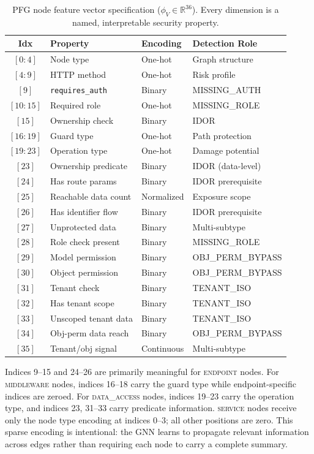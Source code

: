 \begin{table}[htbp]
\centering
\caption{PFG node feature vector specification ($\phi_V \in \mathbb{R}^{36}$).
Every dimension is a named, interpretable security property.}
\label{tab:det-features}
\small
\begin{tabular}{@{}clll@{}}
\toprule
\textbf{Idx} & \textbf{Property} & \textbf{Encoding} & \textbf{Detection Role} \\
\midrule
$[0{:}4]$ & Node type & One-hot & Graph structure \\
$[4{:}9]$ & HTTP method & One-hot & Risk profile \\
$[9]$ & \texttt{requires\_auth} & Binary & MISSING\_AUTH \\
$[10{:}15]$ & Required role & One-hot & MISSING\_ROLE \\
$[15]$ & Ownership check & Binary & IDOR \\
$[16{:}19]$ & Guard type & One-hot & Path protection \\
$[19{:}23]$ & Operation type & One-hot & Damage potential \\
$[23]$ & Ownership predicate & Binary & IDOR (data-level) \\
$[24]$ & Has route params & Binary & IDOR prerequisite \\
$[25]$ & Reachable data count & Normalized & Exposure scope \\
$[26]$ & Has identifier flow & Binary & IDOR prerequisite \\
$[27]$ & Unprotected data & Binary & Multi-subtype \\
$[28]$ & Role check present & Binary & MISSING\_ROLE \\
$[29]$ & Model permission & Binary & OBJ\_PERM\_BYPASS \\
$[30]$ & Object permission & Binary & OBJ\_PERM\_BYPASS \\
$[31]$ & Tenant check & Binary & TENANT\_ISO \\
$[32]$ & Has tenant scope & Binary & TENANT\_ISO \\
$[33]$ & Unscoped tenant data & Binary & TENANT\_ISO \\
$[34]$ & Obj-perm data reach & Binary & OBJ\_PERM\_BYPASS \\
$[35]$ & Tenant/obj signal & Continuous & Multi-subtype \\
\bottomrule
\end{tabular}
\end{table}

Indices 9--15 and 24--26 are primarily meaningful for \textsc{endpoint}
nodes. For \textsc{middleware} nodes, indices 16--18 carry the guard type
while endpoint-specific indices are zeroed. For \textsc{data\_access} nodes,
indices 19--23 carry the operation type, and indices 23, 31--33 carry
predicate information. \textsc{service} nodes receive only the node type
encoding at indices 0--3; all other positions are zero. This sparse encoding
is intentional: the GNN learns to propagate relevant information across
edges rather than requiring each node to carry a complete summary.

